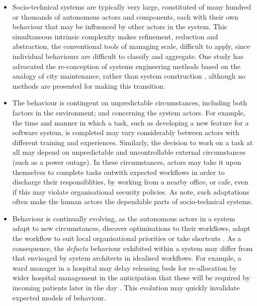 \documentclass{sig-alternate}
\begin{document}
\begin{itemize}

\item Socio-technical systems are typically very large, constituted of many
  hundred or thousands of autonomous actors and components, each with their own
  behaviour that may be influenced by other actors in the system.  This
  simultaneous intrinsic complexity makes refinement, reduction and abstraction,
  the conventional tools of managing scale, difficult to apply, since individual
  behaviours are difficult to classify and aggregate.  One study has advocated
  the re-conception of systems engineering methods based on the analogy of city
  maintenance, rather than system construction \citep{feiler06ultra}, although
  no methods are presented for making this transition.

\item The behaviour is contingent on unpredictable circumstances, including both
  factors in the environment; and concerning the system actors.  For example,
  the time and manner in which a task, such as developing a new feature for a
  software system, is completed may vary considerably between actors with
  different training and experiences.  Similarly, the decision to work on a task
  at all may depend on unpredictable and uncontrollable external circumstances
  (such as a power outage).  In these circumstances, actors may take it upon
  themselves to complete tasks outwith expected workflows in order to discharge
  their responsiblities, by working from a nearby office, or cafe, even if this
  may violate organisational security policies.  As \citet{besnard03human} note,
  such adaptations often make the human actors the dependable parts of
  socio-technical systems.

\item Behaviour is continually evolving, as the autonomous actors in a system
  adapt to new circumstances, discover optimisations to their workflows, adapt
  the workflow to suit local organisational priorities or take shortcuts
  \citep{bonen79evolutionary,anderson04heterogeneous}.  As a consequence, the
  \emph{defacto} behaviour exhibited within a system may differ from that
  envisaged by system architects in idealised workflows.  For example, a ward
  manager in a hospital may delay releasing beds for re-allocation by wider
  hospital management in the anticipation that these will be required by
  incoming patients later in the day \citep{dewsbury07responsibility}.  This
  evolution may quickly invalidate expected models of behaviour.

\end{itemize}
\end{document}
